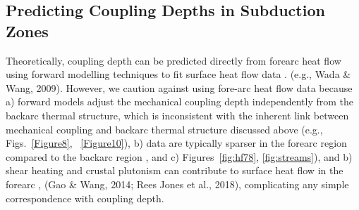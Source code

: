 \documentclass[draft,linenumbers]{agujournal2018} %
\providecommand{\DIFaddtex}[1]{{\protect\color{blue} \sf #1}} %
\providecommand{\DIFdeltex}[1]{{\protect\color{red} \scriptsize #1}} %
\providecommand{\DIFaddbegin}{} %
\providecommand{\DIFaddend}{} %
\providecommand{\DIFdelbegin}{} %
\providecommand{\DIFdelend}{} %
\providecommand{\DIFadd}[1]{\texorpdfstring{\DIFaddtex{#1}}{#1}} %
\providecommand{\DIFdel}[1]{\texorpdfstring{\DIFdeltex{#1}}{}} %
\newcommand{\DIFscaledelfig}{0.3}
\newlength{\DIFdelgraphicswidth} %
\newlength{\DIFdelgraphicsheight} %
\newcommand{\DIFaddincludegraphics}[2][]{{\color{blue}\fbox{\DIFOincludegraphics[#1]{#2}}}} %
\newcommand{\DIFdelincludegraphics}[2][]{%
\sbox{\DIFdelgraphicsbox}{\DIFOincludegraphics[#1]{#2}}%
\settoboxwidth{\DIFdelgraphicswidth}{\DIFdelgraphicsbox} %
\settoboxtotalheight{\DIFdelgraphicsheight}{\DIFdelgraphicsbox} %
\scalebox{\DIFscaledelfig}{%
\parbox[b]{\DIFdelgraphicswidth}{\usebox{\DIFdelgraphicsbox}\\[-\baselineskip] \rule{\DIFdelgraphicswidth}{0em}}\llap{\resizebox{\DIFdelgraphicswidth}{\DIFdelgraphicsheight}{%
\setlength{\unitlength}{\DIFdelgraphicswidth}%
\begin{picture}(1,1)%
\thicklines\linethickness{2pt} %
{\color[rgb]{1,0,0}\put(0,0){\framebox(1,1){}}}%
{\color[rgb]{1,0,0}\put(0,0){\line( 1,1){1}}}%
{\color[rgb]{1,0,0}\put(0,1){\line(1,-1){1}}}%
\end{picture}%
}\hspace*{3pt}}} %
} %
\DeclareRobustCommand{\DIFaddbegin}{\DIFOaddbegin \let\includegraphics\DIFaddincludegraphics} %
\DeclareRobustCommand{\DIFaddend}{\DIFOaddend \let\includegraphics\DIFOincludegraphics} %
\DeclareRobustCommand{\DIFdelbegin}{\DIFOdelbegin \let\includegraphics\DIFdelincludegraphics} %
\DeclareRobustCommand{\DIFdelend}{\DIFOaddend \let\includegraphics\DIFOincludegraphics} %
\begin{document}
\clearpage

\DIFaddend \subsection{Predicting Coupling Depths in Subduction Zones}
\DIFaddbegin

\DIFaddend Theoretically, coupling depth can be predicted directly from forearc
heat flow using forward modelling techniques to fit surface heat flow
data \DIFdelbegin %
\DIFdel{.}\DIFdelend \DIFaddbegin \DIFadd{(e.g., Wada \& Wang, 2009). }\DIFaddend However, we caution against using
fore-arc heat flow data because a) forward models adjust the mechanical
coupling depth independently from the backarc thermal structure, which
is inconsistent with the inherent link between mechanical coupling and
backarc thermal structure discussed above (e.g.,
\DIFdelbegin \DIFdel{Figs.~\ref{Figure8}, ~\ref{Figure10}), b) data are typically sparser in the forearc region compared to the backarc region  }%
\DIFdel{, and c) }\DIFdelend \DIFaddbegin \DIFadd{Figures~\ref{fig:hf78}, \ref{fig:streams}), and b) }\DIFaddend shear heating and
crustal plutonism can contribute to surface heat flow in the forearc
\DIFdelbegin %
\DIFdel{, }\DIFdelend \DIFaddbegin \DIFadd{(Gao \& Wang, 2014; Rees Jones et al., 2018), }\DIFaddend complicating any simple
correspondence with coupling depth.
\end{document}
